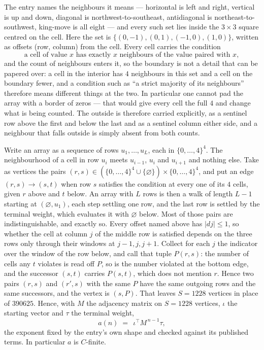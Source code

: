 \documentclass[11pt,a4paper]{article}
\theoremstyle{plain}
\theoremstyle{definition}
\begin{document}
The entry names the neighbours it means --- horizontal is left and right, vertical is up and
down, diagonal is northwest-to-southeast, antidiagonal is northeast-to-southwest, king-move is
all eight --- and every such set lies inside the $3\times3$ square centred on the cell. Here
the set is $\{(0,-1), (0,1), (-1,0), (1,0)\}$, written as offsets (row, column) from the cell. Every cell carries
the condition
\[
\text{a cell of value }x\text{ has exactly }x\text{ neighbours of the value paired with }x,
\]
and the count of neighbours enters it, so the boundary is not a detail that can be papered
over: a cell in the interior has $4$ neighbours in this set and a cell on the boundary
fewer, and a condition such as ``a strict majority of its neighbours'' therefore means
different things at the two. In particular one cannot pad the array with a border of zeros ---
that would give every cell the full $4$ and change what is being counted. The outside is
therefore carried
explicitly, as a sentinel row above the first and below the last and as a sentinel column
either side, and a neighbour that falls outside is simply absent from both counts.

Write an array as a sequence of rows $u_1,\dots,u_L$, each in
$\{0,\dots,4\}^{4}$. The neighbourhood of a cell in row $u_i$ meets $u_{i-1}$,
$u_i$ and $u_{i+1}$ and nothing else. Take as vertices the pairs
$(r,s)\in(\{0,\dots,4\}^{4}\cup\{\varnothing\})\times\{0,\dots,4\}^{4}$,
and put an edge $(r,s)\to(s,t)$ when row $s$ satisfies the condition at every one of its
$4$ cells, given $r$ above and $t$ below. An array with $L$ rows is then a walk of length
$L-1$ starting at $(\varnothing,u_1)$, each step settling one row, and the last row is
settled by the terminal weight, which evaluates it with $\varnothing$ below. Most of those pairs are indistinguishable, and exactly so. Every offset named above has $|dj|\le 1$, so whether the cell at column $j$ of the middle row is satisfied depends on the three rows only through their windows at $j-1,j,j+1$. Collect for each $j$ the indicator over the window of the row below, and call that tuple $P(r,s)$: the number of cells any $t$ violates is read off $P$, so is the number violated at the bottom edge, and the successor $(s,t)$ carries $P(s,t)$, which does not mention $r$. Hence two pairs $(r,s)$ and $(r',s)$ with the same $P$ have the same outgoing rows and the same successors, and the vertex is $(s,P)$. That leaves $S=1228$ vertices in place of $390625$. Hence,
with $M$ the adjacency matrix on $S=1228$ vertices, $\iota$ the starting vector and $\tau$ the
terminal weight,
\[
a(n)\;=\;\,\iota^{\!\top}M^{\,n-1}\tau ,
\]
the exponent fixed by the entry's own shape and checked against its published terms. In
particular $a$ is $C$-finite.
\end{document}

